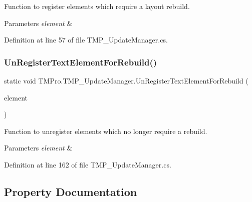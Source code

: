 Function to register elements which require a layout rebuild. 


\begin{DoxyParams}{Parameters}
{\em element} & \\
\hline
\end{DoxyParams}


Definition at line 57 of file T\+M\+P\+\_\+\+Update\+Manager.\+cs.

\mbox{\label{class_t_m_pro_1_1_t_m_p___update_manager_a230503254fd8d8ebc2ba1849ff30dad8}} 
\subsubsection{\texorpdfstring{UnRegisterTextElementForRebuild()}{UnRegisterTextElementForRebuild()}}
{\footnotesize\ttfamily static void T\+M\+Pro.\+T\+M\+P\+\_\+\+Update\+Manager.\+Un\+Register\+Text\+Element\+For\+Rebuild (\begin{DoxyParamCaption}\item[{\mbox{\hyperlink{class_t_m_pro_1_1_t_m_p___text}{T\+M\+P\+\_\+\+Text}}}]{element }\end{DoxyParamCaption})\hspace{0.3cm}{\ttfamily [static]}}



Function to unregister elements which no longer require a rebuild. 


\begin{DoxyParams}{Parameters}
{\em element} & \\
\hline
\end{DoxyParams}


Definition at line 162 of file T\+M\+P\+\_\+\+Update\+Manager.\+cs.



\subsection{Property Documentation}
\mbox{\label{class_t_m_pro_1_1_t_m_p___update_manager_aec0eecf598f0d3eb8e682f0ec6f18f1f}} 
